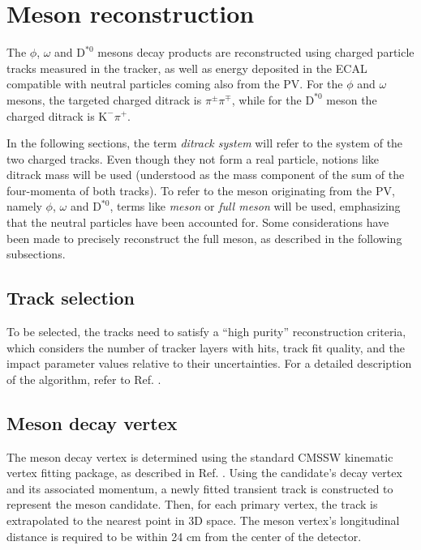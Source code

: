 \section{Meson reconstruction}\label{sec:meson_reconstruction}

The $\phi$, $\omega$ and $\text{D}^{*0}$ mesons decay products are reconstructed using charged particle tracks measured in the tracker, as well as energy deposited in the ECAL compatible with neutral particles coming also from the PV. For the $\phi$ and $\omega$ mesons, the targeted charged ditrack is $\pi^\pm\pi^\mp$, while for the $\text{D}^{*0}$ meson the charged ditrack is $\text{K}^{-}\pi^{+}$.

In the following sections, the term \textit{ditrack system} will refer to the system of the two charged tracks. Even though they not form a real particle, notions like ditrack mass will be used (understood as the mass component of the sum of the four-momenta of both tracks). To refer to the meson originating from the PV, namely $\phi$, $\omega$ and $\text{D}^{*0}$, terms like \textit{meson} or \textit{full meson} will be used, emphasizing that the neutral particles have been accounted for. Some considerations have been made to precisely reconstruct the full meson, as described in the following subsections.

\subsection{Track selection}
To be selected, the tracks need to satisfy a ``high purity'' reconstruction criteria, which considers the number of tracker layers with hits, track fit quality, and the impact parameter values relative to their uncertainties. For a detailed description of the algorithm, refer to Ref. \cite{CMS:2014pgm}.

\subsection{Meson decay vertex}
The meson decay vertex is determined using the standard CMSSW \cite{CMSSW} kinematic vertex fitting package, as described in Ref. \cite{Prokofiev:2005zz}. Using the candidate's decay vertex and its associated momentum, a newly fitted transient track is constructed to represent the meson candidate. Then, for each primary vertex, the track is extrapolated to the nearest point in 3D space. The meson vertex's longitudinal distance is required to be within 24 cm from the center of the detector.

